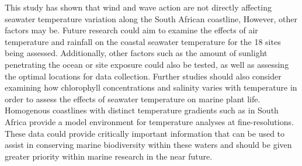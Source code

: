 \documentclass[12pt,A4paper,]{article}
\begin{document}
This study has shown that wind and wave action are not directly
affecting seawater temperature variation along the South African
coastline, However, other factors may be. Future research could aim to
examine the effects of air temperature and rainfall on the coastal
seawater temperature for the 18 sites being assessed. Additionally,
other factors such as the amount of sunlight penetrating the ocean or
site exposure could also be tested, as well as assessing the optimal
locations for data collection. Further studies should also consider
examining how chlorophyll concentrations and salinity varies with
temperature in order to assess the effects of seawater temperature on
marine plant life. Homogenous coastlines with distinct temperature
gradients such as in South Africa provide a model environment for
temperature analyses at fine-resolutions. These data could provide
critically important information that can be used to assist in
conserving marine biodiversity within these waters and should be given
greater priority within marine research in the near future.
\end{document}
